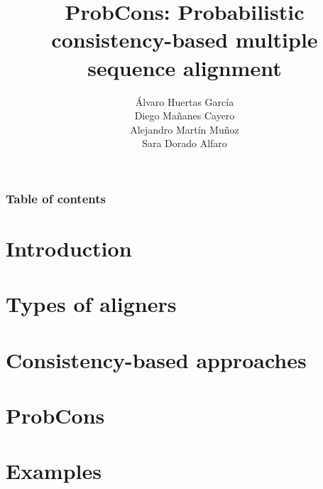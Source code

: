 \documentclass[11pt]{beamer}
\title[ProbCons]{ProbCons: Probabilistic consistency-based multiple sequence alignment}
\author[Group 5]{Álvaro Huertas García \\ Diego Mañanes Cayero
                 \\ Alejandro Martín Muñoz \\ Sara Dorado Alfaro}
\begin{document}
\frame{\titlepage}
\begin{frame}
    \frametitle{Table of contents}
    \tableofcontents
\end{frame}

\section{Introduction} 


\section{Types of aligners}


\section{Consistency-based approaches}


\section{ProbCons}


\section{Examples}


\frame{\titlepage}
\end{document}
